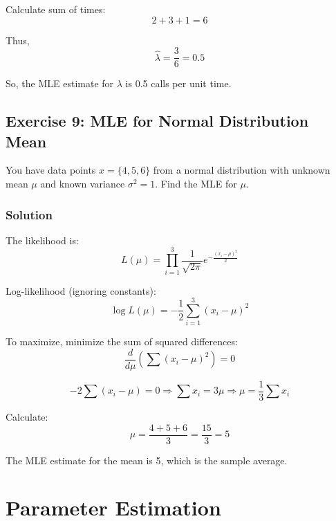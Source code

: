 \documentclass{book}
\begin{document}
Calculate sum of times:
\[
2 + 3 + 1 = 6
\]

Thus,
\[
\hat{\lambda} = \frac{3}{6} = 0.5
\]

So, the MLE estimate for $\lambda$ is 0.5 calls per unit time.

\subsection*{Exercise 9: MLE for Normal Distribution Mean}
You have data points $x = \{4, 5, 6\}$ from a normal distribution with unknown mean $\mu$ and known variance $\sigma^2 = 1$. Find the MLE for $\mu$.

\subsubsection*{Solution}
The likelihood is:
\[
L(\mu) = \prod_{i=1}^3 \frac{1}{\sqrt{2\pi}} e^{-\frac{(x_i - \mu)^2}{2}}
\]

Log-likelihood (ignoring constants):
\[
\log L(\mu) = -\frac{1}{2} \sum_{i=1}^3 (x_i - \mu)^2
\]

To maximize, minimize the sum of squared differences:
\[
\frac{d}{d\mu} \left( \sum (x_i - \mu)^2 \right) = 0
\]

\[
-2 \sum (x_i - \mu) = 0 \Rightarrow \sum x_i = 3 \mu \Rightarrow \mu = \frac{1}{3} \sum x_i
\]

Calculate:
\[
\mu = \frac{4 + 5 + 6}{3} = \frac{15}{3} = 5
\]

The MLE estimate for the mean is 5, which is the sample average.

\newpage

\section*{Parameter Estimation}
\end{document}
